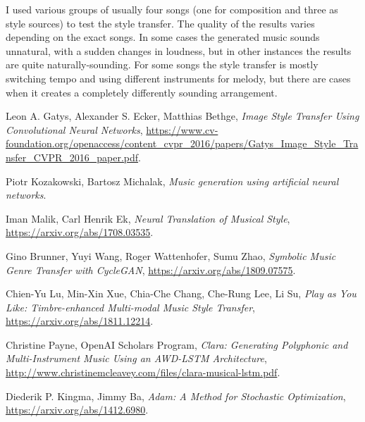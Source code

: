 \documentclass[en]{pracamgr}
\begin{document}
I used various groups of usually four songs (one for composition and three as style sources) to test the style transfer.
The quality of the results varies depending on the exact songs.
In some cases the generated music sounds unnatural, with a sudden changes in loudness, but in other instances the results are quite naturally-sounding.
For some songs the style transfer is mostly switching tempo and using different instruments for melody, but there are cases when it creates a completely differently sounding arrangement.



\begin{thebibliography}{99}

 Leon A. Gatys, Alexander S. Ecker, Matthias Bethge, \textit{Image Style Transfer Using Convolutional Neural Networks}, \url{https://www.cv-foundation.org/openaccess/content_cvpr_2016/papers/Gatys_Image_Style_Transfer_CVPR_2016_paper.pdf}.

 Piotr Kozakowski, Bartosz Michalak, \textit{Music generation using artificial neural networks}.

 Iman Malik, Carl Henrik Ek, \textit{Neural Translation of Musical Style}, \url{https://arxiv.org/abs/1708.03535}.

 Gino Brunner, Yuyi Wang, Roger Wattenhofer, Sumu Zhao, \textit{Symbolic Music Genre Transfer with CycleGAN}, \url{https://arxiv.org/abs/1809.07575}.

 Chien-Yu Lu, Min-Xin Xue, Chia-Che Chang, Che-Rung Lee, Li Su, \textit{Play as You Like: Timbre-enhanced Multi-modal Music Style Transfer}, \url{https://arxiv.org/abs/1811.12214}.

 Christine Payne, OpenAI Scholars Program, \textit{Clara: Generating Polyphonic and Multi-Instrument Music Using an AWD-LSTM Architecture}, \url{http://www.christinemcleavey.com/files/clara-musical-lstm.pdf}.

 Diederik P. Kingma, Jimmy Ba, \textit{Adam: A Method for Stochastic Optimization}, \url{https://arxiv.org/abs/1412.6980}.

\end{thebibliography}
\end{document}

